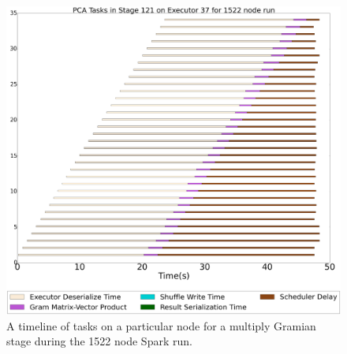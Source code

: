 




\begin{figure}[t]
\centering
\includegraphics[width=.4\textwidth]{fig/spark_pca_hero_timeline.png}
\caption{A timeline of tasks on a particular node for a multiply Gramian stage during the 1522 node Spark run. }
\label{fig:hero-timeline}
\end{figure}




